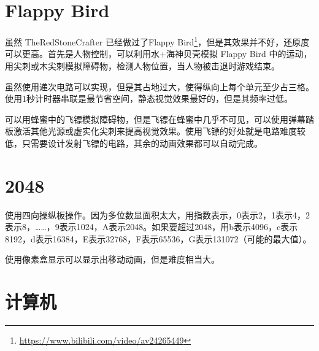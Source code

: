 \section{Flappy Bird}
虽然 TheRedStoneCrafter 已经做过了Flappy Bird\footnote{\url{https://www.bilibili.com/video/av24265449}}，但是其效果并不好，还原度可以更高。首先是人物控制，可以利用水+海神贝壳模拟 Flappy Bird 中的运动，用尖刺或木尖刺模拟障碍物，检测人物位置，当人物被击退时游戏结束。

虽然使用递次电路可以实现，但是其占地过大，使得纵向上每个单元至少占三格。使用1秒计时器串联是最节省空间，静态视觉效果最好的，但是其频率过低。

可以用蜂蜜中的飞镖模拟障碍物，但是飞镖在蜂蜜中几乎不可见，可以使用弹幕踏板激活其他光源或虚实化尖刺来提高视觉效果。使用飞镖的好处就是电路难度较低，只需要设计发射飞镖的电路，其余的动画效果都可以自动完成。

\section{2048}
使用四向操纵板操作。因为多位数显面积太大，用指数表示，0表示2，1表示4，2表示8，……，9表示1024，A表示2048。如果要超过2048，用b表示4096，c表示8192，d表示16384，E表示32768，F表示65536，G表示131072（可能的最大值）。

使用像素盒显示可以显示出移动动画，但是难度相当大。

\section{计算机}